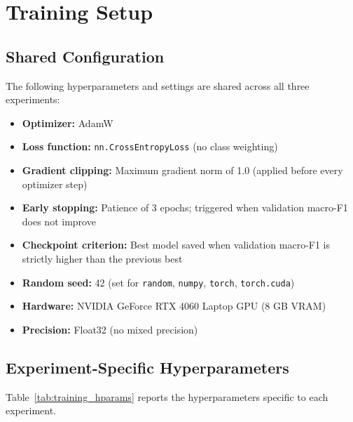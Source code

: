 \section{Training Setup}

\subsection{Shared Configuration}

The following hyperparameters and settings are shared across all three experiments:

\begin{itemize}
    \item \textbf{Optimizer:} AdamW \cite{loshchilov2019adamw}
    \item \textbf{Loss function:} \texttt{nn.CrossEntropyLoss} (no class weighting)
    \item \textbf{Gradient clipping:} Maximum gradient norm of 1.0 (applied before every optimizer step)
    \item \textbf{Early stopping:} Patience of 3 epochs; triggered when validation macro-F1 does not improve
    \item \textbf{Checkpoint criterion:} Best model saved when validation macro-F1 is strictly higher than the previous best
    \item \textbf{Random seed:} 42 (set for \texttt{random}, \texttt{numpy}, \texttt{torch}, \texttt{torch.cuda})
    \item \textbf{Hardware:} NVIDIA GeForce RTX 4060 Laptop GPU (8 GB VRAM)
    \item \textbf{Precision:} Float32 (no mixed precision)
\end{itemize}

\subsection{Experiment-Specific Hyperparameters}

Table~\ref{tab:training_hparams} reports the hyperparameters specific to each experiment.

